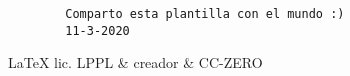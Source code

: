 \newpage
\vspace*{\fill}
\begin{verbatim}
        Comparto esta plantilla con el mundo :)
        11-3-2020
\end{verbatim}
\LaTeX{} lic. LPPL \& creador \& CC-ZERO
\doclicenseThis


